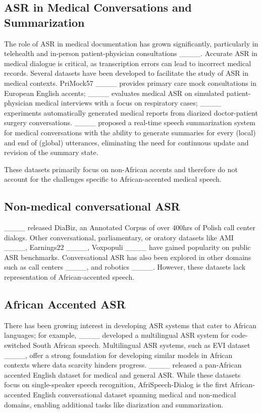 \subsection{ASR in Medical Conversations and Summarization}
The role of ASR in medical documentation has grown significantly, particularly in telehealth and in-person patient-physician consultations ____. Accurate ASR in medical dialogue is critical, as transcription errors can lead to incorrect medical records. Several datasets have been developed to facilitate the study of ASR in medical contexts. PriMock57 ____ provides primary care mock consultations in European English accents; 
____ evaluates medical ASR on simulated patient-physician medical interviews with a focus on respiratory cases; ____ experiments automatically generated medical reports from diarized doctor-patient surgery conversations. %
____ proposed a real-time speech summarization system for medical conversations with the ability to generate summaries for every (local) and end of (global) utterances, eliminating the need for continuous update and revision of the summary state. 

These datasets primarily focus on non-African accents and therefore do not account for the challenges specific to African-accented medical speech.

\subsection{Non-medical conversational ASR} 
____ released DiaBiz, an Annotated Corpus of over 400hrs of Polish call center dialogs. Other conversational, parliamentary, or oratory datasets like AMI ____, Earnings22 ____, Voxpopuli ____ have gained popularity on public ASR benchmarks. Conversational ASR has also been explored in other domains such as call centers ____, and robotics ____. However, these datasets lack representation of African-accented speech.

\subsection{African Accented ASR}
There has been growing interest in developing ASR systems that cater to African languages; for example, ____ developed a multilingual ASR system for code-switched South African speech. 
Multilingual ASR systems, such as EVI dataset ____, offer a strong foundation for developing similar models in African contexts where data scarcity hinders progress. ____ released a pan-African accented English dataset for medical and general ASR. While these datasets focus on single-speaker speech recognition, AfriSpeech-Dialog is the first African-accented English conversational dataset spanning medical and non-medical domains, enabling additional tasks like diarization and summarization.


